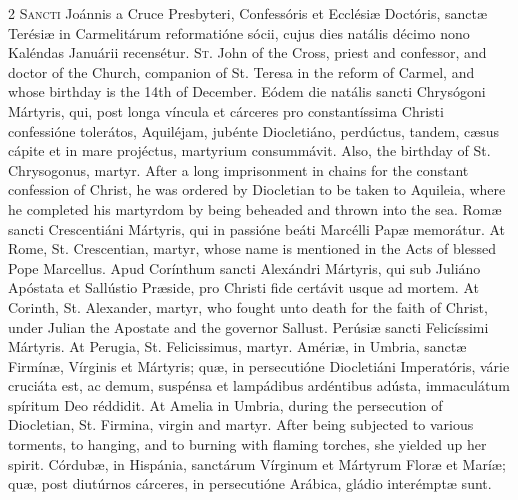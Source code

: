 \begin{paracol}{2}
\lettrine[lines=2]{S}{ancti} Joánnis a Cruce 
 Presbyteri, Confessóris et Eccl\'esiæ Doctóris, sanctæ Terésiæ in 
 Carmelitárum reformatióne sócii, cujus dies natális décimo nono Kaléndas 
 Januárii recensétur.
\switchcolumn
{}
\lettrine[lines=2]{S}{t.} John of the Cross, priest and 
 confessor, and doctor of the Church, companion of St. Teresa in the reform 
 of Carmel, and whose birthday is the 14th of December.
\switchcolumn*
{}
Eódem die natális 
 sancti Chrysógoni Mártyris, qui, post longa víncula et cárceres pro 
 constantíssima Christi confessióne tolerátos, Aquiléjam, jubénte Diocletiáno, 
 perdúctus, tandem, cæsus cápite et in mare projéctus, martyrium consummávit.
\switchcolumn
{}
Also, the birthday of St. 
 Chrysogonus, martyr. After a long imprisonment in chains for the 
 constant confession of Christ, he was ordered by Diocletian to be taken to 
 Aquileia, where he completed his martyrdom by being beheaded and thrown into 
 the sea.
\switchcolumn*
{}
Romæ sancti 
 Crescentiáni Mártyris, qui in passióne beáti Marcélli Papæ memorátur.
\switchcolumn
{}
At Rome, St. Crescentian, martyr, 
 whose name is mentioned in the Acts of blessed Pope Marcellus.
\switchcolumn*
{}
Apud Corínthum sancti 
 Alexándri Mártyris, qui sub Juliáno Apóstata et Sallústio Præside, pro 
 Christi fide certávit usque ad mortem.
\switchcolumn
{}
At Corinth, St. Alexander, martyr, 
 who fought unto death for the faith of Christ, under Julian the Apostate and 
 the governor Sallust.
\switchcolumn*
{}
Perúsiæ sancti 
 Felicíssimi Mártyris.
\switchcolumn
{}
At Perugia, St. Felicissimus, 
 martyr.
\switchcolumn*
{}
Amériæ, in Umbria, 
 sanctæ Firmínæ, Vírginis et Mártyris; quæ, in persecutióne Diocletiáni 
 Imperatóris, várie cruciáta est, ac demum, suspénsa et lampádibus ardéntibus 
 adústa, immaculátum spíritum Deo réddidit.
\switchcolumn
{}
At Amelia in Umbria, during the 
 persecution of Diocletian, St. Firmina, virgin and martyr. After being 
 subjected to various torments, to hanging, and to burning with flaming 
 torches, she yielded up her spirit.
\switchcolumn*
{}
Córdubæ, in Hispánia, 
 sanctárum Vírginum et Mártyrum Floræ et Maríæ; quæ, post diutúrnos cárceres, 
 in persecutióne Arábica, gládio interémptæ sunt.
\switchcolumn
{}

\end{paracol}
